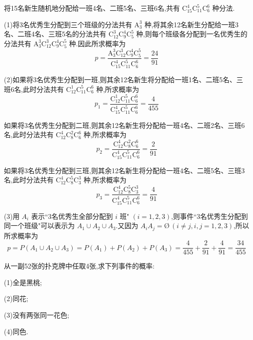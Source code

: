 \begin{solution}
    将15名新生随机地分配给一班4名、二班5名、三班6名,共有 $\mathrm{C}_{15}^4 \mathrm{C}_{11}^5 \mathrm{C}_6^6$ 种分法.

    (1)将3名优秀生分配到三个班级的分法共有 $\mathrm{A}_3^3$ 种,将其余12名新生分配给一班3名、二班4名、三班5名的分法共有 $\mathrm{C}_{12}^3 \mathrm{C}_9^4 \mathrm{C}_5^5$ 种,则每个班级各分配到一名优秀生的分法共有 $\mathrm{A}_3^3 \mathrm{C}_{12}^3 \mathrm{C}_9^4 \mathrm{C}_5^5$ 种.因此所求概率为
    $$
    p = \dfrac{\mathrm{A}_3^3 \mathrm{C}_{12}^3 \mathrm{C}_9^4 \mathrm{C}_5^5}{\mathrm{C}_{15}^4 \mathrm{C}_{11}^5 \mathrm{C}_6^6} = \dfrac{24}{91}
    $$

    (2)如果将3名优秀生分配到一班,则其余12名新生将分配给一班1名、二班5名、三班6名,此时分法共有 $\mathrm{C}_{12}^1 \mathrm{C}_{11}^5 \mathrm{C}_6^6$ 种,所求概率为
    $$
    p_1 = \dfrac{\mathrm{C}_{12}^1 \mathrm{C}_{11}^5 \mathrm{C}_6^6}{\mathrm{C}_{15}^4 \mathrm{C}_{11}^5 \mathrm{C}_6^6} = \dfrac{4}{455}
    $$

    如果将3名优秀生分配到二班,则其余12名新生将分配给一班4名、二班2名、三班6名,此时分法共有 $\mathrm{C}_{12}^4 \mathrm{C}_{8}^2 \mathrm{C}_6^6$ 种,所求概率为
    $$
    p_2 = \dfrac{\mathrm{C}_{12}^4 \mathrm{C}_{8}^2 \mathrm{C}_6^6}{\mathrm{C}_{15}^4 \mathrm{C}_{11}^5 \mathrm{C}_6^6} = \dfrac{2}{91}
    $$

    如果将3名优秀生分配到三班,则其余12名新生将分配给一班4名、二班5名、三班3名,此时分法共有 $\mathrm{C}_{12}^4 \mathrm{C}_{8}^5 \mathrm{C}_3^3$ 种,所求概率为
    $$
    p_3 = \dfrac{\mathrm{C}_{12}^4 \mathrm{C}_{8}^5 \mathrm{C}_3^3}{\mathrm{C}_{15}^4 \mathrm{C}_{11}^5 \mathrm{C}_6^6} = \dfrac{4}{91}
    $$

    (3)用 $A_i$ 表示``3名优秀生全部分配到 $i$ 班" $(i=1,2,3)$,则事件``3名优秀生分配到同一个班级"可以表示为 $A_1 \cup A_2 \cup A_3$.又因为 $A_i A_j = \text{\O} \, (i \not= j, i,j=1,2,3)$,所以所求概率为
    $$
    p = P(A_1 \cup A_2 \cup A_3) = P(A_1) + P(A_2) + P(A_3) = \dfrac{4}{455} + \dfrac{2}{91} + \dfrac{4}{91} = \dfrac{34}{455}
    $$
\end{solution}

\question 从一副52张的扑克牌中任取4张,求下列事件的概率:

(1)全是黑桃;

(2)同花;

(3)没有两张同一花色;

(4)同色.

